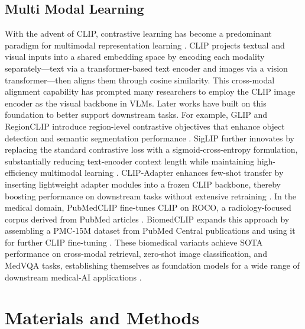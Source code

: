 \documentclass[bioengineering,article,submit,pdftex,moreauthors]{Definitions/mdpi}
\begin{document}
\subsection{Multi Modal Learning}
With the advent of CLIP, contrastive learning has become a predominant paradigm for multimodal representation learning \cite{radford_learning_2021}. 
CLIP projects textual and visual inputs into a shared embedding space by encoding each modality separately—text via a transformer-based text encoder and images via a vision transformer—then aligns them through cosine similarity. 
This cross-modal alignment capability has prompted many researchers to employ the CLIP image encoder as the visual backbone in VLMs. 
Later works have built on this foundation to better support downstream tasks. For example, GLIP and RegionCLIP introduce region-level contrastive objectives that enhance object detection and semantic segmentation performance \cite{li_grounded_2022,zhong_regionclip_2022}.
SigLIP further innovates by replacing the standard contrastive loss with a sigmoid-cross-entropy formulation, substantially reducing text-encoder context length while maintaining high-efficiency multimodal learning \cite{zhai_sigmoid_2023}. 
CLIP-Adapter enhances few-shot transfer by inserting lightweight adapter modules into a frozen CLIP backbone, thereby boosting performance on downstream tasks without extensive retraining \cite{gao_clip-adapter_2024}. 
In the medical domain, PubMedCLIP fine-tunes CLIP on ROCO, a radiology-focused corpus derived from PubMed articles \cite{eslami_pubmedclip_2023,pelka_radiology_2018}. 
BiomedCLIP expands this approach by assembling a PMC-15M dataset from PubMed Central publications and using it for further CLIP fine-tuning \cite{zhang_biomedclip_2025}. 
These biomedical variants achieve SOTA performance on cross-modal retrieval, zero-shot image classification, and MedVQA tasks, establishing themselves as foundation models for a wide range of downstream medical-AI applications \cite{koleilat_medclip-sam_2024,zhao_foundation_2024,polis_exploring_2025}.




\section{Materials and Methods}
\end{document}
